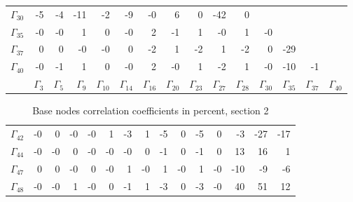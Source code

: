 {\begin{table}
\begin{center}
\begin{minipage}{\linewidth}
\begin{center}
\begin{envsmall}
\begin{center}
\begin{tabular}{rrrrrrrrrrrrrrr}
\( \Gamma_{30} \) &   -5 &   -4 &  -11 &   -2 &   -9 &   -0 &    6 &    0 &  -42 &    0 &  &  &  &  \\
\( \Gamma_{35} \) &   -0 &   -0 &    1 &    0 &   -0 &    2 &   -1 &    1 &   -0 &    1 &   -0 &  &  &  \\
\( \Gamma_{37} \) &    0 &    0 &   -0 &   -0 &    0 &   -2 &    1 &   -2 &    1 &   -2 &    0 &  -29 &  &  \\
\( \Gamma_{40} \) &   -0 &   -1 &    1 &    0 &   -0 &    2 &   -0 &    1 &   -2 &    1 &   -0 &  -10 &   -1 &  \\
 & \( \Gamma_{3} \) & \( \Gamma_{5} \) & \( \Gamma_{9} \) & \( \Gamma_{10} \) & \( \Gamma_{14} \) & \( \Gamma_{16} \) & \( \Gamma_{20} \) & \( \Gamma_{23} \) & \( \Gamma_{27} \) & \( \Gamma_{28} \) & \( \Gamma_{30} \) & \( \Gamma_{35} \) & \( \Gamma_{37} \) & \( \Gamma_{40} \)
\\\hline
\end{tabular}
\end{center}
\end{envsmall}
\ifhevea\else
\end{center}
\end{minipage}
\fi
\end{center}
\ifhevea\end{table}\fi
\ifhevea\begin{table}\fi%
\begin{center}
\ifhevea
\caption{Base nodes correlation coefficients in percent, section 2\label{tab:tau:br-fit-corr2}}%
\else
\begin{minipage}{\linewidth}
\begin{center}
\label{tab:tau:br-fit-corr2}%
\fi
\begin{envsmall}
\begin{center}
\renewcommand*{\arraystretch}{1.1}%
\begin{tabular}{rrrrrrrrrrrrrrr}
\hline
\( \Gamma_{42} \) &   -0 &    0 &   -0 &   -0 &    1 &   -3 &    1 &   -5 &    0 &   -5 &    0 &   -3 &  -27 &  -17 \\
\( \Gamma_{44} \) &   -0 &   -0 &    0 &   -0 &   -0 &   -0 &    0 &   -1 &    0 &   -1 &    0 &   13 &   16 &    1 \\
\( \Gamma_{47} \) &    0 &    0 &   -0 &    0 &   -0 &    1 &   -0 &    1 &   -0 &    1 &   -0 &  -10 &   -9 &   -6 \\
\( \Gamma_{48} \) &   -0 &   -0 &    1 &   -0 &    0 &   -1 &    1 &   -3 &    0 &   -3 &   -0 &   40 &   51 &   12 \\

\end{tabular}
\end{center}
\end{envsmall}
\end{center}
\end{minipage}
\end{center}
\end{table}}
